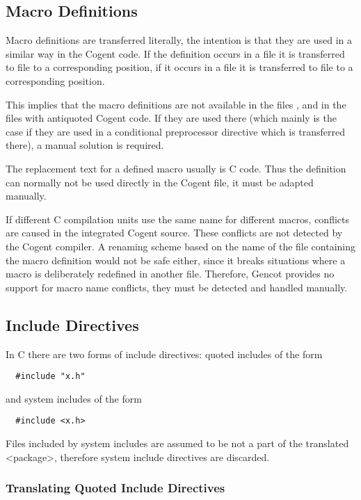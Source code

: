 \subsection{Macro Definitions}

Macro definitions are transferred literally, the intention is that they are used in a similar way in the Cogent code.
If the definition occurs in a file  it is transferred to file  to a corresponding position,
if it occurs in a file  it is transferred to file  to a corresponding position.

This implies that the macro definitions are not available in the files , 
 and in the files with
antiquoted Cogent code. If they are used there (which mainly is the case if they are used in a conditional
preprocessor directive which is transferred there), a manual solution is required. 

The replacement text for a defined macro usually is C code. Thus the definition can normally not be used directly in
the Cogent file, it must be adapted manually. 

If different C compilation units use the same name for different macros, conflicts are caused in the integrated Cogent
source. These conflicts are not detected by the Cogent compiler. A renaming scheme based on the name of the file 
containing the macro definition would not be safe either, since it breaks situations where a macro is deliberately
redefined in another file. Therefore, Gencot provides no support for macro name conflicts, they must be detected and
handled manually.

\subsection{Include Directives}

In C there are two forms of include directives: quoted includes of the form
\begin{verbatim}
  #include "x.h"
\end{verbatim}
and system includes of the form
\begin{verbatim}
  #include <x.h>
\end{verbatim}
Files included by system includes are assumed to be not a part of the translated <package>, therefore system
include directives are discarded.

\subsubsection{Translating Quoted Include Directives}

